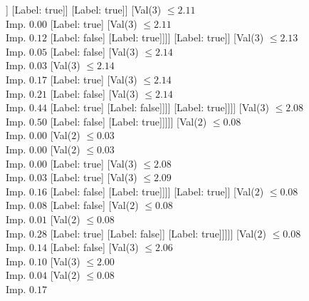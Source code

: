 \documentclass[margin=10pt]{standalone}
\begin{document}
\begin{forest}
													[Val($3$) $ \leq 2.08$ \\ Imp. $0.01$
														[Val($3$) $ \leq 2.08$ \\ Imp. $0.09$
															[Label: true]
															[Label: false]]
														[Label: true]]
													[Label: true]]
												[Val($3$) $ \leq 2.11$ \\ Imp. $0.00$
													[Label: true]
													[Val($3$) $ \leq 2.11$ \\ Imp. $0.12$
														[Label: false]
														[Label: true]]]]
											[Label: true]]
										[Val($3$) $ \leq 2.13$ \\ Imp. $0.05$
											[Label: false]
											[Val($3$) $ \leq 2.14$ \\ Imp. $0.03$
												[Val($3$) $ \leq 2.14$ \\ Imp. $0.17$
													[Label: true]
													[Val($3$) $ \leq 2.14$ \\ Imp. $0.21$
														[Label: false]
														[Val($3$) $ \leq 2.14$ \\ Imp. $0.44$
															[Label: true]
															[Label: false]]]]
												[Label: true]]]]
									[Val($3$) $ \leq 2.08$ \\ Imp. $0.50$
										[Label: false]
										[Label: true]]]]]
						[Val($2$) $ \leq 0.08$ \\ Imp. $0.00$
							[Val($2$) $ \leq 0.03$ \\ Imp. $0.00$
								[Val($2$) $ \leq 0.03$ \\ Imp. $0.00$
									[Label: true]
									[Val($3$) $ \leq 2.08$ \\ Imp. $0.03$
										[Label: true]
										[Val($3$) $ \leq 2.09$ \\ Imp. $0.16$
											[Label: false]
											[Label: true]]]]
								[Label: true]]
							[Val($2$) $ \leq 0.08$ \\ Imp. $0.08$
								[Label: false]
								[Val($2$) $ \leq 0.08$ \\ Imp. $0.01$
									[Val($2$) $ \leq 0.08$ \\ Imp. $0.28$
										[Label: true]
										[Label: false]]
									[Label: true]]]]]
					[Val($2$) $ \leq 0.08$ \\ Imp. $0.14$
						[Label: false]
						[Val($3$) $ \leq 2.06$ \\ Imp. $0.10$
							[Val($3$) $ \leq 2.00$ \\ Imp. $0.04$
								[Val($2$) $ \leq 0.08$ \\ Imp. $0.17$

\end{forest}
\end{document}
